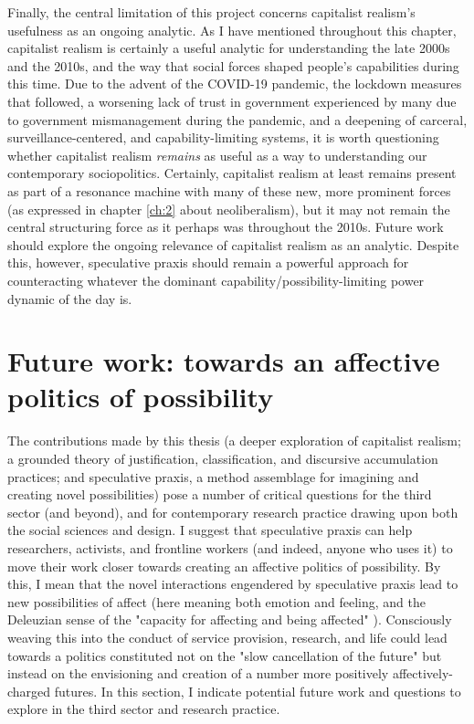 Finally, the central limitation of this project concerns capitalist realism's usefulness as an ongoing analytic. As I have mentioned throughout this chapter, capitalist realism is certainly a useful analytic for understanding the late 2000s and the 2010s, and the way that social forces shaped people's capabilities during this time. Due to the advent of the COVID-19 pandemic, the lockdown measures that followed, a worsening lack of trust in government experienced by many due to government mismanagement during the pandemic, and a deepening of carceral, surveillance-centered, and capability-limiting systems, it is worth questioning whether capitalist realism \textit{remains} as useful as a way to understanding our contemporary sociopolitics. Certainly, capitalist realism at least remains present as part of a resonance machine with many of these new, more prominent forces (as expressed in chapter \ref{ch:2} about neoliberalism), but it may not remain the central structuring force as it perhaps was throughout the 2010s. Future work should explore the ongoing relevance of capitalist realism as an analytic. Despite this, however, speculative praxis should remain a powerful approach for counteracting whatever the dominant capability/possibility-limiting power dynamic of the day is.

\section{Future work: towards an affective politics of possibility}
The contributions made by this thesis (a deeper exploration of capitalist realism; a grounded theory of justification, classification, and discursive accumulation practices; and speculative praxis, a method assemblage for imagining and creating novel possibilities) pose a number of critical questions for the third sector (and beyond), and for contemporary research practice drawing upon both the social sciences and design. I suggest that speculative praxis can help researchers, activists, and frontline workers (and indeed, anyone who uses it) to move their work closer towards creating an affective politics of possibility. By this, I mean that the novel interactions engendered by speculative praxis lead to new possibilities of affect (here meaning both emotion and feeling, and the Deleuzian sense of the "capacity for affecting and being affected" \citep[p. 625]{deleuze_ethology_1992}). Consciously weaving this into the conduct of service provision, research, and life could lead towards a politics constituted not on the "slow cancellation of the future" \citep[p. 5]{fisher_ghosts_2014} but instead on the envisioning and creation of a number  more positively affectively-charged futures. In this section, I indicate potential future work and questions to explore in the third sector and research practice.

